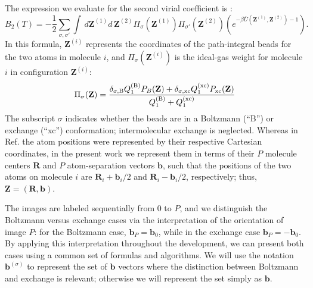         The expression we evaluate for the second virial coefficient is \cite{Garberoglio2014}:
        \begin{equation}
        \label{eq:B2}
            B_2(T) =  - \frac{1}{2}\sum\limits_{\sigma ,\sigma '} \int \,d {\mathbf Z}^{(1)} d\,{\mathbf Z}^{(2)} \Pi _\sigma ({\mathbf Z}^{(1)}) \Pi _{\sigma '}({\mathbf Z}^{(2)}) \left( e^{ - \beta \bar U({\mathbf Z}^{(1)} , {\mathbf Z}^{(2)}) - 1} \right).
        \end{equation}
        In this formula, ${\mathbf Z}^{(i)}$ represents the coordinates of the path-integral beads for the two atoms in molecule $i$, and
        $\Pi_\sigma({\mathbf Z}^{(i)})$ is the ideal-gas weight for molecule $i$ in configuration ${\mathbf Z}^{(i)}$:
        \begin{equation}
        \label{eq:weight}
            \Pi _\sigma ({\mathbf Z}) = \frac{\delta _{\sigma ,{\rm B}} Q_1^{({\rm B})} P_B ({\mathbf Z}) + \delta _{\sigma ,{\rm xc}} Q_1^{({\rm xc})} P_{\rm xc} ({\mathbf Z})} { Q_1^{({\rm B})} + Q_1^{({\rm xc})}}
        \end{equation}
        The subscript $\sigma$ indicates whether the beads are in a Boltzmann (``B'') or exchange (``xc'') conformation; intermolecular exchange is neglected. Whereas in Ref.  the atom positions were represented by their respective Cartesian coordinates, in the present work we represent them in terms of their $P$ molecule centers ${\mathbf R}$ and $P$ atom-separation vectors ${\mathbf b}$, such that the positions of the two atoms on molecule $i$ are ${\mathbf R}_i+{\mathbf b}_i/2$ and ${\mathbf R}_i-{\mathbf b}_i/2$, respectively; thus, ${\mathbf Z} = ({\mathbf R},{\mathbf b})$.

        The images are labeled sequentially from 0 to $P$, and we distinguish the Boltzmann versus exchange cases via the interpretation of the orientation of image $P$: for the Boltzmann case, ${\mathbf b}_P = {\mathbf b}_0$, while in the exchange case ${\mathbf b}_P = -{\mathbf b}_0$. By applying this interpretation throughout the development, we can present both cases using a common set of formulas and algorithms. We will use the notation ${\mathbf b}^{(\sigma)}$ to represent the set of ${\mathbf b}$ vectors where the distinction between Boltzmann and exchange is relevant; otherwise we will represent the set simply as ${\mathbf b}$.

